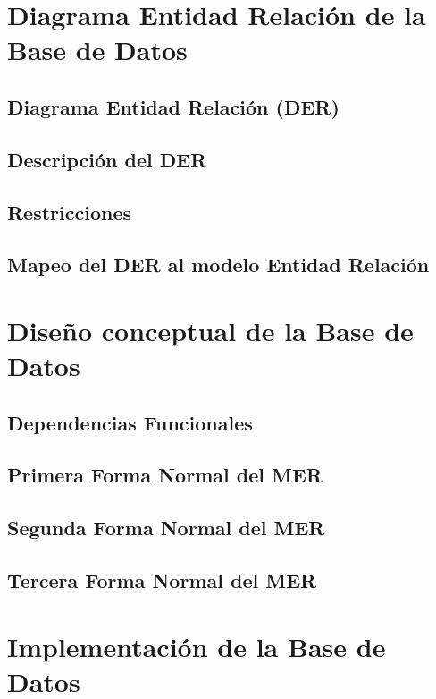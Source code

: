 \documentclass[11pt]{article}
\begin{document}
\section{Diagrama Entidad Relación de la Base de Datos}
\subsection{Diagrama Entidad Relación (DER)}

\subsection{Descripción del DER}

\subsection{Restricciones}

\subsection{Mapeo del DER al modelo Entidad Relación}


\section{Diseño conceptual de la Base de Datos}
\subsection{Dependencias Funcionales}

\subsection{Primera Forma Normal del MER}

\subsection{Segunda Forma Normal del MER}

\subsection{Tercera Forma Normal del MER}

\section{Implementación de la Base de Datos}
\end{document}
